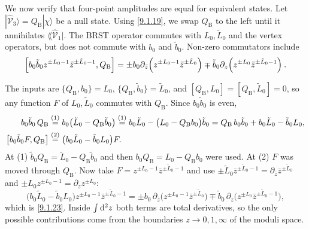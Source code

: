 We now verify that four-point amplitudes are equal for equivalent states. Let $|\hat{\mathscr{V}}_{3}\rangle=Q_{\mathrm{B}}|\chi\rangle$ be a null state.
Using \eqref{9.1.19}, we swap $Q_{\mathrm{B}}$ to the left until it annihilates $\lAngle\hat{\mathscr{V}}_{1}|$. 
The BRST operator commutes with $L_{0}, \tilde{L}_{0}$ and the vertex operators, but does not commute with $b_{0}$ and $\tilde{b}_{0}$.
Non-zero commutators include
\begin{equation}
	\Bigl[b_{0} \tilde{b}_{0} z^{\pm L_{0}-1} \bar{z}^{\pm \tilde{L}_{0}-1}, Q_{\mathrm{B}}\Bigr] = 
	\pm b_{0} \partial_{\bar{z}}\Bigl(z^{\pm L_{0}-1} \bar{z}^{\pm \tilde{L}_{0}}\Bigr) \mp 
	\tilde{b}_{0} \partial_{z}\Bigl(z^{\pm L_{0}} \bar{z}^{\pm \tilde{L}_{0}-1}\Bigr) \:.
	\label{9.1.23}
\end{equation}
\begin{tcolorbox}[breakable]
	\begin{remark}
		The inputs are $\{Q_{\mathrm B},b_0\}=L_0$, $\{Q_{\mathrm B},\tilde b_0\}=\tilde L_0$, and $[Q_{\mathrm B},L_0]=[Q_{\mathrm B},\tilde L_0]=0$, so any function $F$ of $L_0,\tilde L_0$ commutes with $Q_{\mathrm B}$. Since $b_0\tilde b_0$ is even,
		\begin{align*}
			b_0\tilde b_0\,Q_{\mathrm B}
			&\overset{(1)}{=} b_0\bigl(\tilde L_0-Q_{\mathrm B}\tilde b_0\bigr)
			\overset{(1)}{=} b_0\tilde L_0-\bigl(L_0-Q_{\mathrm B}b_0\bigr)\tilde b_0
			=Q_{\mathrm B}\,b_0\tilde b_0+b_0\tilde L_0-\tilde b_0L_0 ,\\
			\bigl[b_0\tilde b_0F,Q_{\mathrm B}\bigr]
			&\overset{(2)}{=} \bigl(b_0\tilde L_0-\tilde b_0L_0\bigr)F .
		\end{align*}
		At (1) $\tilde b_0Q_{\mathrm B}=\tilde L_0-Q_{\mathrm B}\tilde b_0$ and then $b_0Q_{\mathrm B}=L_0-Q_{\mathrm B}b_0$ were used. At (2) $F$ was moved through $Q_{\mathrm B}$. Now take $F=z^{\pm L_0-1}\bar z^{\pm\tilde L_0-1}$ and use $\pm\tilde L_0\bar z^{\pm\tilde L_0-1}=\partial_{\bar z}\bar z^{\pm\tilde L_0}$ and $\pm L_0z^{\pm L_0-1}=\partial_zz^{\pm L_0}$:
		\begin{equation*}
			\bigl(b_0\tilde L_0-\tilde b_0L_0\bigr)z^{\pm L_0-1}\bar z^{\pm\tilde L_0-1}
			=\pm b_0\,\partial_{\bar z}\bigl(z^{\pm L_0-1}\bar z^{\pm\tilde L_0}\bigr)\mp\tilde b_0\,\partial_z\bigl(z^{\pm L_0}\bar z^{\pm\tilde L_0-1}\bigr) ,
		\end{equation*}
		which is \eqref{9.1.23}. Inside $\int\mathrm{d}^2z$ both terms are total derivatives, so the only possible contributions come from the boundaries $z\to0,1,\infty$ of the moduli space.
	\end{remark}
\end{tcolorbox}
